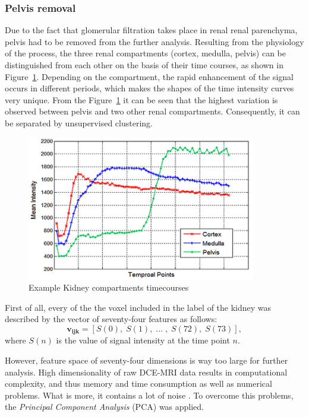 \subsubsection{Pelvis removal}
Due to the fact that glomerular filtration takes place in renal renal parenchyma, pelvis had to be removed from the further analysis. 
\newpage
Resulting from the physiology of the process, the three renal compartments (cortex, medulla, pelvis) can be distinguished from each other on the basis of their time courses, as shown in Figure~\ref{fig:timecourses}. Depending on the compartment, the rapid enhancement of the signal occurs in different periods, which makes the shapes of the time intensity curves very unique.
From the Figure~\ref{fig:timecourses} it can be seen that the highest variation is observed between pelvis and two other renal compartments.
Consequently, it can be separated by unsupervised clustering.
\vspace{0.5cm}

\begin{figure}[H]
	\centering
	\includegraphics[width=10cm]{img/timecourses}
	\caption[Example kidney compartments timecourses]{Example Kidney compartments timecourses \cite{KidneySubsegmentation}}
	\label{fig:timecourses}
\end{figure}

First of all, every of the the voxel included in the label of the kidney was described by the vector of seventy-four features as follows:
\begin{equation}
\label{eq:voxel}
\mathbf{v_{ijk}} = [S(0),\; S(1),\;...\;,\; S(72),\; S(73)],
\end{equation}
where $S(n)$ is the value of signal intensity at the time point $n$.

However, feature space of seventy-four dimensions is way too large for further analysis. High dimensionality of raw DCE-MRI data results in computational complexity, and thus memory and time consumption as well as numerical problems. What is more, it contains a lot of noise \cite{KidneySubsegmentation}. To overcome this problems, the \textit{Principal Component Analysis} (PCA) \cite{pca} was applied.

